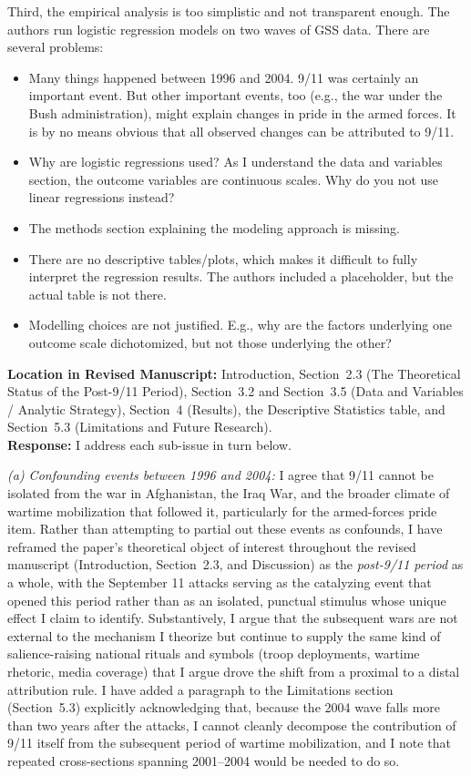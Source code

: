 \documentclass[11pt]{article}
\begin{document}
\begin{reviewercomment}
Third, the empirical analysis is too simplistic and not transparent enough. The authors run logistic regression models on two waves of GSS data. There are several problems: 
\begin{itemize}
\item Many things happened between 1996 and 2004. 9/11 was certainly an important event. But other important events, too (e.g., the war under the Bush administration), might explain changes in pride in the armed forces. It is by no means obvious that all observed changes can be attributed to 9/11.
\item Why are logistic regressions used? As I understand the data and variables section, the outcome variables are continuous scales. Why do you not use linear regressions instead?
\item The methods section explaining the modeling approach is missing.
\item There are no descriptive tables/plots, which makes it difficult to fully interpret the regression results. The authors included a placeholder, but the actual table is not there.
\item Modelling choices are not justified. E.g., why are the factors underlying one outcome scale dichotomized, but not those underlying the other?
\end{itemize}
\end{reviewercomment}

\noindent\textbf{Location in Revised Manuscript:} Introduction, Section~2.3 (The Theoretical Status of the Post-9/11 Period), Section~3.2 and Section~3.5 (Data and Variables / Analytic Strategy), Section~4 (Results), the Descriptive Statistics table, and Section~5.3 (Limitations and Future Research).\\[4pt]
\textbf{Response:} I address each sub-issue in turn below.

\textit{(a) Confounding events between 1996 and 2004:} I agree that 9/11 cannot be isolated from the war in Afghanistan, the Iraq War, and the broader climate of wartime mobilization that followed it, particularly for the armed-forces pride item. Rather than attempting to partial out these events as confounds, I have reframed the paper's theoretical object of interest throughout the revised manuscript (Introduction, Section~2.3, and Discussion) as the \textit{post-9/11 period} as a whole, with the September 11 attacks serving as the catalyzing event that opened this period rather than as an isolated, punctual stimulus whose unique effect I claim to identify. Substantively, I argue that the subsequent wars are not external to the mechanism I theorize but continue to supply the same kind of salience-raising national rituals and symbols (troop deployments, wartime rhetoric, media coverage) that I argue drove the shift from a proximal to a distal attribution rule. I have added a paragraph to the Limitations section (Section~5.3) explicitly acknowledging that, because the 2004 wave falls more than two years after the attacks, I cannot cleanly decompose the contribution of 9/11 itself from the subsequent period of wartime mobilization, and I note that repeated cross-sections spanning 2001--2004 would be needed to do so.
\end{document}
